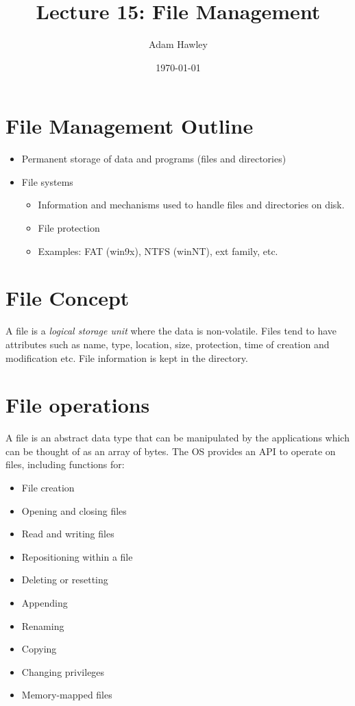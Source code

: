 \documentclass[11pt]{article}
\author{Adam Hawley}
\date{\today}
\title{Lecture 15: File Management}
\begin{document}
\maketitle
\tableofcontents


\section{File Management Outline}
\label{sec:org6774802}
\begin{itemize}
\item Permanent storage of data and programs (files and directories)
\item File systems
\begin{itemize}
\item Information and mechanisms used to handle files and directories on disk.
\item File protection
\item Examples: FAT (win9x), NTFS (winNT), ext family, etc.
\end{itemize}
\end{itemize}

\section{File Concept}
\label{sec:org3a870a9}
A file is a \emph{logical storage unit} where the data is non-volatile.
Files tend to have attributes such as name, type, location, size, protection, time of creation and modification etc.
File information is kept in the directory.

\section{File operations}
\label{sec:org6aaaa07}
A file is an abstract data type that can be manipulated by the applications which can be thought of as an array of bytes.
The OS provides an API to operate on files, including functions for:
\begin{itemize}
\item File creation
\item Opening and closing files
\item Read and writing files
\item Repositioning within a file
\item Deleting or resetting
\item Appending
\item Renaming
\item Copying
\item Changing privileges
\item Memory-mapped files
\end{itemize}
\end{document}
